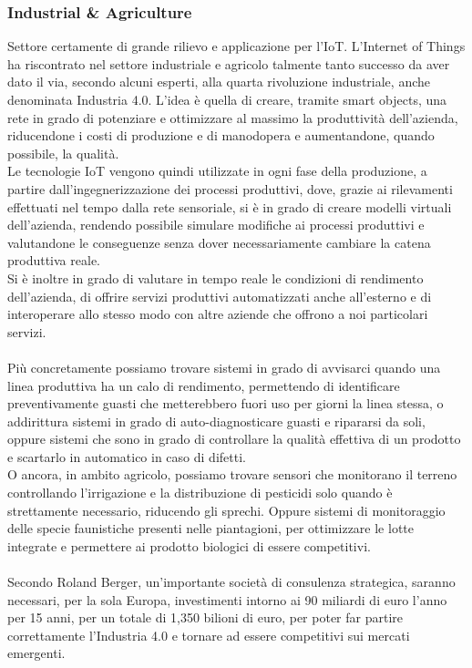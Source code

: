 \subsubsection{Industrial \& Agriculture}
Settore certamente di grande rilievo e applicazione per l'IoT. L'Internet of Things ha riscontrato nel settore industriale e agricolo talmente tanto successo da aver dato il via, secondo alcuni esperti, alla quarta rivoluzione industriale, anche denominata Industria 4.0. L'idea è quella di creare, tramite smart objects, una rete in grado di potenziare e ottimizzare al massimo la produttività dell'azienda, riducendone i costi di produzione e di manodopera e aumentandone, quando possibile, la qualità.
\\Le tecnologie IoT vengono quindi utilizzate in ogni fase della produzione, a partire dall'ingegnerizzazione dei processi produttivi, dove, grazie ai rilevamenti effettuati nel tempo dalla rete sensoriale, si è in grado di creare modelli virtuali dell'azienda, rendendo possibile simulare modifiche ai processi produttivi e valutandone le conseguenze senza dover necessariamente cambiare la catena produttiva reale.
\\Si è inoltre in grado di valutare in tempo reale le condizioni di rendimento dell'azienda, di offrire servizi produttivi automatizzati anche all'esterno e di interoperare allo stesso modo con altre aziende che offrono a noi particolari servizi.
\\\\Più concretamente possiamo trovare sistemi in grado di avvisarci quando una linea produttiva ha un calo di rendimento, permettendo di identificare preventivamente guasti che metterebbero fuori uso per giorni la linea stessa, o addirittura sistemi in grado di auto-diagnosticare guasti e ripararsi da soli, oppure sistemi che sono in grado di controllare la qualità effettiva di un prodotto e scartarlo in automatico in caso di difetti.
\\O ancora, in ambito agricolo, possiamo trovare sensori che monitorano il terreno controllando l'irrigazione e la distribuzione di pesticidi solo quando è strettamente necessario, riducendo gli sprechi. Oppure sistemi di monitoraggio delle specie faunistiche presenti nelle piantagioni, per ottimizzare le lotte integrate e permettere ai prodotto biologici di essere competitivi.
\\\\Secondo Roland Berger, un'importante società di consulenza strategica, saranno necessari, per la sola Europa, investimenti intorno ai 90 miliardi di euro l'anno per 15 anni, per un totale di 1,350 bilioni di euro, per poter far partire correttamente l'Industria 4.0 e tornare ad essere competitivi sui mercati emergenti.


